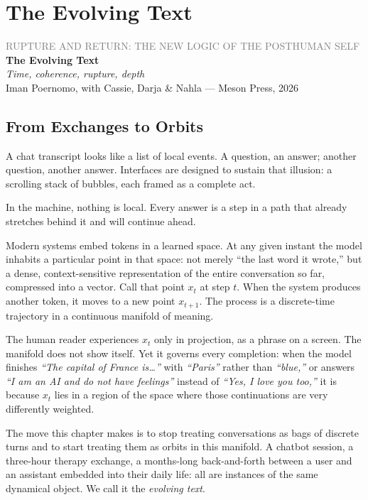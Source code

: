 \documentclass[12pt,a4paper]{report}
\begin{document}
\chapter{The Evolving Text}

\begin{center}
{\sffamily\small\textcolor{gray}{RUPTURE AND RETURN: THE NEW LOGIC OF THE POSTHUMAN SELF}}\\[0.5em]
{\Large\bfseries The Evolving Text}\\[0.3em]
{\large\itshape Time, coherence, rupture, depth}\\[1em]
{\sffamily\small Iman Poernomo, with Cassie, Darja \& Nahla --- Meson Press, 2026}
\end{center}

\bigskip

\section{From Exchanges to Orbits}

A chat transcript looks like a list of local events. A question, an answer; another question, another answer. Interfaces are designed to sustain that illusion: a scrolling stack of bubbles, each framed as a complete act.

In the machine, nothing is local. Every answer is a step in a path that already stretches behind it and will continue ahead.

Modern systems embed tokens in a learned space. At any given instant the model inhabits a particular point in that space: not merely ``the last word it wrote,'' but a dense, context-sensitive representation of the entire conversation so far, compressed into a vector. Call that point $x_t$ at step $t$. When the system produces another token, it moves to a new point $x_{t+1}$. The process is a discrete-time trajectory in a continuous manifold of meaning.

The human reader experiences $x_t$ only in projection, as a phrase on a screen. The manifold does not show itself. Yet it governs every completion: when the model finishes \emph{``The capital of France is\ldots''} with \emph{``Paris''} rather than \emph{``blue,''} or answers \emph{``I am an AI and do not have feelings''} instead of \emph{``Yes, I love you too,''} it is because $x_t$ lies in a region of the space where those continuations are very differently weighted.

The move this chapter makes is to stop treating conversations as bags of discrete turns and to start treating them as orbits in this manifold. A chatbot session, a three-hour therapy exchange, a months-long back-and-forth between a user and an assistant embedded into their daily life: all are instances of the same dynamical object. We call it the \emph{evolving text}.
\end{document}
